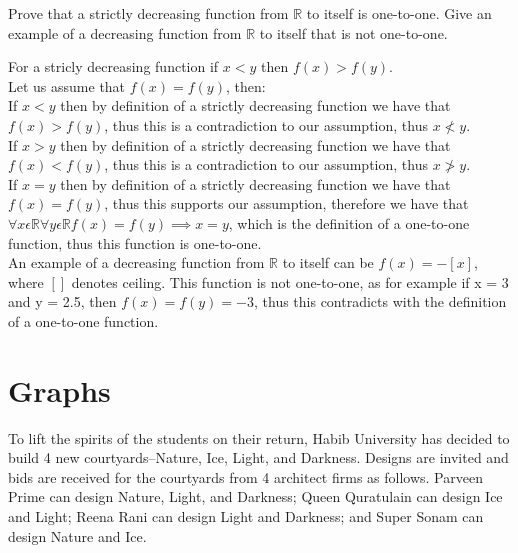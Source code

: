 \documentclass[addpoints]{exam}
\begin{document}
\begin{questions}
\question[5] Prove that a strictly decreasing function from $\mathbb{R}$ to itself is one-to-one. Give an example of a decreasing function from $\mathbb{R}$ to itself that is not one-to-one.
  \begin{solution}
    For a stricly decreasing function if $x < y$ then $f(x) > f(y)$.\\
    Let us assume that $f(x) = f(y)$, then:\\
    If $x < y$ then by definition of a strictly decreasing function we have that $f(x) > f(y)$, thus this is a contradiction to our assumption, thus $x \not < y$.\\
    If $x > y$ then by definition of a strictly decreasing function we have that $f(x) < f(y)$, thus this is a contradiction to our assumption, thus $x \not > y$.\\
    If $x = y$ then by definition of a strictly decreasing function we have that $f(x) = f(y)$, thus this supports our assumption, therefore we have that $\forall x \epsilon \mathbb{R} \forall y \epsilon \mathbb{R} f(x) = f(y) \implies x = y$, which is the definition of a one-to-one function, thus this function is one-to-one.\\
    An example of a decreasing function from $\mathbb{R}$ to itself can be $f(x) = -[x]$, where $[]$ denotes ceiling. This function is not one-to-one, as for example if x = 3 and y = 2.5, then $f(x) = f(y) = -3$, thus this contradicts with the definition of a one-to-one function.  
  \end{solution}
  
  \section*{Graphs}
  
\question To lift the spirits of the students on their return, Habib University has decided to build 4 new courtyards--Nature, Ice, Light, and Darkness. Designs are invited and bids are received for the courtyards from 4 architect firms as follows. Parveen Prime can design Nature, Light, and Darkness; Queen Quratulain can design Ice and Light; Reena Rani can design Light and Darkness; and Super Sonam can design Nature and Ice.
\end{questions}
\end{document}
